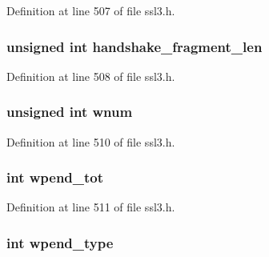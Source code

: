 Definition at line 507 of file ssl3.\+h.

\subsubsection[{\texorpdfstring{handshake\+\_\+fragment\+\_\+len}{handshake_fragment_len}}]{\setlength{\rightskip}{0pt plus 5cm}unsigned int handshake\+\_\+fragment\+\_\+len}\hypertarget{structssl3__state__st_a810b0f6ab3d1979beb8c3a45cfc21987}{}\label{structssl3__state__st_a810b0f6ab3d1979beb8c3a45cfc21987}


Definition at line 508 of file ssl3.\+h.

\subsubsection[{\texorpdfstring{wnum}{wnum}}]{\setlength{\rightskip}{0pt plus 5cm}unsigned int wnum}\hypertarget{structssl3__state__st_a2255b8340cdda4fd06078836b88485b8}{}\label{structssl3__state__st_a2255b8340cdda4fd06078836b88485b8}


Definition at line 510 of file ssl3.\+h.

\subsubsection[{\texorpdfstring{wpend\+\_\+tot}{wpend_tot}}]{\setlength{\rightskip}{0pt plus 5cm}int wpend\+\_\+tot}\hypertarget{structssl3__state__st_a11c4b34b49cb1ce9711d3b4f993980fb}{}\label{structssl3__state__st_a11c4b34b49cb1ce9711d3b4f993980fb}


Definition at line 511 of file ssl3.\+h.

\subsubsection[{\texorpdfstring{wpend\+\_\+type}{wpend_type}}]{\setlength{\rightskip}{0pt plus 5cm}int wpend\+\_\+type}\hypertarget{structssl3__state__st_ae6edd816faa4ac6bed637524020efb7b}{}\label{structssl3__state__st_ae6edd816faa4ac6bed637524020efb7b}



